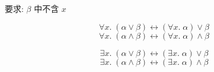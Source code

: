 \begin{frame}{}
  \begin{center}
    要求: $\beta$ 中不含 $x$
  \end{center}

  \[
    \forall x.\; (\alpha \lor \beta) \leftrightarrow (\forall x.\; \alpha) \lor \beta
  \]
  \[
    \forall x.\; (\alpha \land \beta) \leftrightarrow (\forall x.\; \alpha) \land \beta
  \]

  \pause
  \[
    \exists x.\; (\alpha \lor \beta) \leftrightarrow (\exists x.\; \alpha) \lor \beta
  \]
  \[
    \exists x.\; (\alpha \land \beta) \leftrightarrow (\exists x.\; \alpha) \land \beta
  \]
\end{frame}
